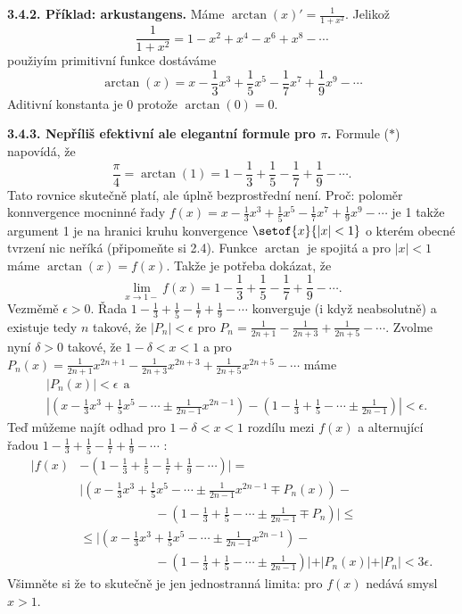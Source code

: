 \documentclass[12pt]{article}
\begin{document}
\medskip

{\bf 3.4.2. Příklad: arkustangens.} Máme $\arctan(x)'=\frac{1}{1+x^2}$. Jelikož
$$
\frac{1}{1+x^2}=1-x^2+x^4-x^6+x^8-\cdots
$$
použiyím primitivní funkce dostáváme
\begin{equation}
\arctan(x)=x-\frac13 x^3+\frac15 x^5-\frac17 x^7+\frac19 x^9-\cdots \tag{$*$}
\end{equation}
Aditivní konstanta je 0 protože $\arctan(0)=0$.

\medskip

{\bf 3.4.3. Nepříliš efektivní ale elegantní formule pro $\pi$.} Formule ($*$)  napovídá, že
$$
\frac{\pi}{4}=\arctan(1)=1-\frac13 +\frac15 -\frac17 +\frac19 -\cdots.
$$
Tato rovnice skutečně platí, ale úplně bezprostřední není. Proč: poloměr konnvergence mocninné řady
 $f(x)=x-\frac13 x^3+\frac15 x^5-\frac17 x^7+\frac19 x^9-\cdots$ je 1 takže argument 1 je na hranici kruhu konvergence $\setof{x}{|x|<1}$ o kterém obecné tvrzení nic neříká  (připomeňte si 2.4). Funkce $\arctan$ je spojitá a pro $|x|<1$ máme $\arctan(x)=f(x)$. Takže je potřeba dokázat, že
 $$
 \lim_{x\to 1-}f(x)=1-\frac13 +\frac15 -\frac17 +\frac19 -\cdots.
 $$
 Vezměmě $\epsilon>0$. Řada $1-\frac13 +\frac15 -\frac17 +\frac19 -\cdots$ konverguje (i když neabsolutně) a
existuje tedy $n$ takové, že $|P_n|<\epsilon$
 pro $P_n=\frac{1}{2n+1}-\frac{1}{2n+3}+\frac{1}{2n+5}-\cdots$. Zvolme nyní $\delta>0$ takové, že $1-\delta<x<1$ a pro $P_n(x)=\frac{1}{2n+1}x^{2n+1}-\frac{1}{2n+3}x^{2n+3}+\frac{1}{2n+5}x^{2n+5}-\cdots$ máme
 $$
 \begin{aligned}
 &|P_n(x)|<\epsilon\ \  \text{a}\\
 &|(x-\frac13 x^3+\frac15 x^5-\cdots\pm\frac{1}{2n-1}x^{2n-1})-
 (1-\frac13 +\frac15 -\cdots\pm\frac{1}{2n-1})|<\epsilon. 
 \end{aligned}
 $$
 Teď můžeme najít odhad pro $1-\delta<x<1$ rozdílu mezi $f(x)$ a alternující řadou $1-\frac13 +\frac15 -\frac17 +\frac19 -\cdots$ :
 $$
 \begin{aligned}
 |f(x)&-(1-\frac13 +\frac15 -\frac17 +\frac19 -\cdots)|=\\
 &|(x-\frac13 x^3+\frac15 x^5-\cdots\pm\frac{1}{2n-1}x^{2n-1}\mp P_n(x)) -\\
 &\qquad\qquad\qquad-(1-\frac13 +\frac15 -\cdots\pm\frac{1}{2n-1}\mp P_n)|\leq\\
 &\leq|(x-\frac13 x^3+\frac15 x^5-\cdots\pm\frac{1}{2n-1}x^{2n-1})-\\
 &\qquad\qquad\qquad-(1-\frac13 +\frac15 - \cdots\pm\frac{1}{2n-1})|+|P_n(x)|+|P_n|<3\epsilon.
 \end{aligned}
 $$
 Všimněte si že to skutečně je jen jednostranná limita: pro $f(x)$ nedává smysl $x>1$. 
\end{document}
